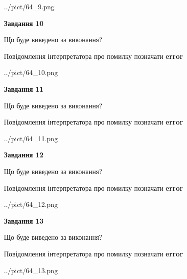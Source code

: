\documentclass[11pt, ukrainian]{article}
\begin{document}
{\begin {large}
\begin{center}
	{../pict/64_9.png}
\end{center}
\newpage

{\begin {center}\textbf{Завдання 10}\end {center}}\par
Що буде виведено за виконання? \par
Повідомлення інтерпретатора про помилку позначати \textbf{error}

\begin{center}
	{../pict/64_10.png}
\end{center}
\newpage

{\begin {center}\textbf{Завдання 11}\end {center}}\par
Що буде виведено за виконання? \par
Повідомлення інтерпретатора про помилку позначати \textbf{error}

\begin{center}
	{../pict/64_11.png}
\end{center}
\newpage

{\begin {center}\textbf{Завдання 12}\end {center}}\par
Що буде виведено за виконання? \par
Повідомлення інтерпретатора про помилку позначати \textbf{error}

\begin{center}
	{../pict/64_12.png}
\end{center}
\newpage

{\begin {center}\textbf{Завдання 13}\end {center}}\par
Що буде виведено за виконання? \par
Повідомлення інтерпретатора про помилку позначати \textbf{error}

\begin{center}
	{../pict/64_13.png}
\end{center}
\newpage


\end{large}}
\end{document}
